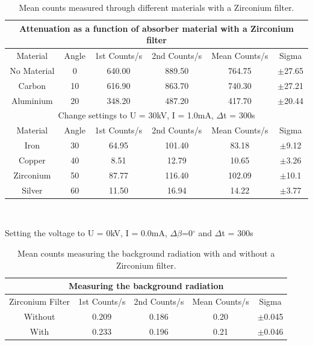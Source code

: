 \documentclass[12pt]{article}
\begin{document}
\begin{table}[H]
\begin{center}
 \footnotesize
 \begin{tabular}{|c||c||c|c||c|c|}
 \hline
 \multicolumn{6}{|c|}{Attenuation as a function of absorber material with a Zirconium filter} \\
 \hline 
 Material & Angle & 1st Counts/s & 2nd Counts/s & Mean Counts/s & Sigma\\
 \hline \hline
  No Material & 0 & 640.00 & 889.50 & 764.75 & $\pm$27.65 \\
 \hline
  Carbon & 10 & 616.90 & 863.70 & 740.30 & $\pm$27.21 \\
 \hline 
  Aluminium & 20 & 348.20 & 487.20 & 417.70 & $\pm$20.44 \\
 \hline \hline
 \multicolumn{6}{|c|}{ Change settings to U = 30kV, I = 1.0mA, $\Delta$t = 300s} \\
  \hline 
  Material & Angle & 1st Counts/s & 2nd Counts/s & Mean Counts/s & Sigma\\
 \hline \hline
  Iron & 30 & 64.95 & 101.40 & 83.18 & $\pm$9.12 \\
 \hline
  Copper & 40 & 8.51 & 12.79 & 10.65 & $\pm$3.26 \\
 \hline 
  Zirconium & 50 & 87.77 & 116.40 & 102.09 & $\pm$10.1\\
 \hline 
  Silver & 60 & 11.50 & 16.94 & 14.22 & $\pm$3.77 \\
 \hline 
 \end{tabular} \\ 
 \caption{Mean counts measured through different materials with a Zirconium filter.}
 \label{Material Filter}
\end{center}
\end{table}

Setting the voltage to U = 0kV, I = 0.0mA, $\Delta \beta$=0$^{\circ}$ and $\Delta$t = 300s \cite{Exp.D-2020}


\begin{table}[H]
\begin{center}
 \footnotesize
 \begin{tabular}{|c||c|c||c|c|}
 \hline
 \multicolumn{5}{|c|}{Measuring the background radiation} \\
 \hline 
 Zirconium Filter & 1st Counts/s & 2nd Counts/s & Mean Counts/s & Sigma\\
 \hline \hline
  Without & 0.209 & 0.186 & 0.20 & $\pm$0.045 \\
 \hline
  With  & 0.233 & 0.196 & 0.21 & $\pm$0.046 \\
 \hline 
 \end{tabular} \\ 
 \caption{Mean counts measuring the background radiation with and without a Zirconium filter.}
 \label{Background Radiation}
\end{center}
\end{table}
\end{document}
